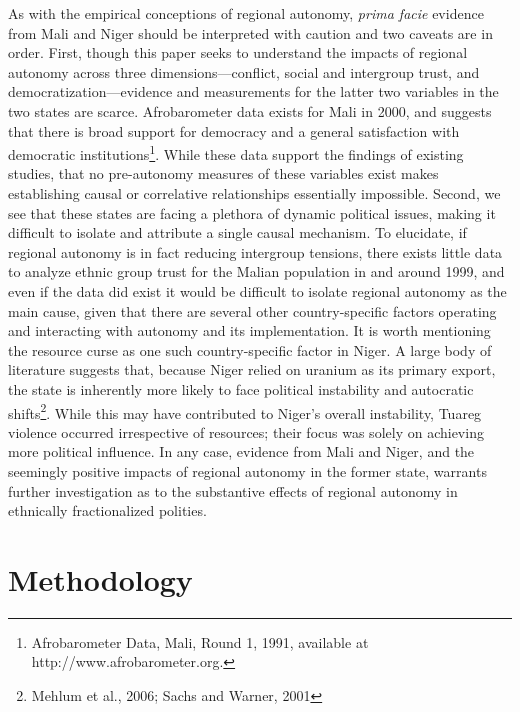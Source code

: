 \documentclass[12pt]{article}
\begin{document}
As with the empirical conceptions of regional autonomy, \textit{prima facie} evidence from Mali and Niger should be interpreted with caution and two caveats are in order. First, though this paper seeks to understand the impacts of regional autonomy across three dimensions---conflict, social and intergroup trust, and democratization---evidence and measurements for the latter two variables in the two states are scarce. Afrobarometer data exists for Mali in 2000, and suggests that there is broad support for democracy and a general satisfaction with democratic institutions\footnote{Afrobarometer Data, Mali, Round 1, 1991, available at http://www.afrobarometer.org.}. While these data support the findings of existing studies, that no pre-autonomy measures of these variables exist makes establishing causal or correlative relationships essentially impossible. Second, we see that these states are facing a plethora of dynamic political issues, making it difficult to isolate and attribute a single causal mechanism. To elucidate, if regional autonomy is in fact reducing intergroup tensions, there exists little data to analyze ethnic group trust for the Malian population in and around 1999, and even if the data did exist it would be difficult to isolate regional autonomy as the main cause, given that there are several other country-specific factors operating and interacting with autonomy and its implementation. It is worth mentioning the resource curse as one such country-specific factor in Niger. A large body of literature suggests that, because Niger relied on uranium as its primary export, the state is inherently more likely to face political instability and autocratic shifts\footnote{Mehlum et al., 2006; Sachs and Warner, 2001}. While this may have contributed to Niger's overall instability, Tuareg violence occurred irrespective of resources; their focus was solely on achieving more political influence. In any case, evidence from Mali and Niger, and the seemingly positive impacts of regional autonomy in the former state, warrants further investigation as to the substantive effects of regional autonomy in ethnically fractionalized polities. 

\section{Methodology}
\end{document}
